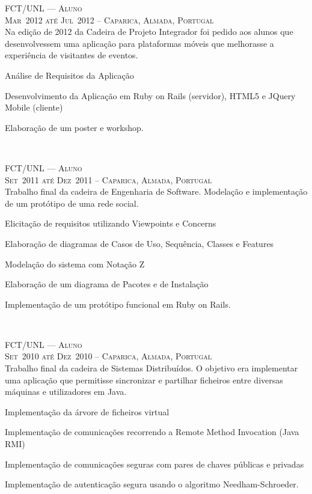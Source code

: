 \documentclass[a4paper,fontsize=10pt]{scrartcl} %
\begin{document}
\begin{minipage}[t]{0.5\textwidth}
\textsc{FCT/UNL --- Aluno}\\
\small\textsc{Mar~2012 até Jul~2012 -- Caparica, Almada, Portugal}\\ \normalsize
Na edição de 2012 da Cadeira de Projeto Integrador foi pedido aos alunos que desenvolvessem uma aplicação para plataformas móveis que melhorasse a experiência de visitantes de eventos.\\
\begin{inparaitem} 
	\item[] Análise de Requisitos da Aplicação
	\item Desenvolvimento da Aplicação em Ruby on Rails (servidor), HTML5 e JQuery Mobile (cliente)
	\item Elaboração de um poster e workshop.
\end{inparaitem}
\\\par

\textsc{FCT/UNL --- Aluno}\\
\small\textsc{Set~2011 até Dez~2011 -- Caparica, Almada, Portugal}\\ \normalsize
Trabalho final da cadeira de Engenharia de Software.
Modelação e implementação de um protótipo de uma rede social.\\
\begin{inparaitem} 
	\item[] Elicitação de requisitos utilizando Viewpoints e Concerns
	\item Elaboração de diagramas de Casos de Uso, Sequência, Classes e Features 
	\item Modelação do sistema com Notação Z
	\item Elaboração de um diagrama de Pacotes e de Instalação
	\item Implementação de um protótipo funcional em Ruby on Rails.
\end{inparaitem}
\\\par

\textsc{FCT/UNL --- Aluno}\\
\small\textsc{Set~2010 até Dez~2010 -- Caparica, Almada, Portugal}\\ \normalsize
Trabalho final da cadeira de Sistemas Distribuídos.
O objetivo era implementar uma aplicação que permitisse sincronizar e partilhar ficheiros entre diversas máquinas e utilizadores em Java.\\
\begin{inparaitem} 
	\item[] Implementação da árvore de ficheiros virtual
	\item Implementação de comunicações recorrendo a Remote Method Invocation (Java RMI)
	\item Implementação de comunicações seguras com pares de chaves públicas e privadas
	\item Implementação de autenticação segura usando o algoritmo Needham-Schroeder.
\end{inparaitem}
\\\par


\end{minipage}
\end{document}
